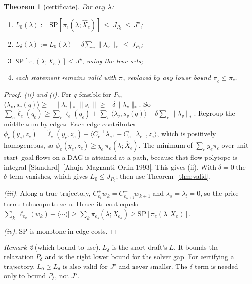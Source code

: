 \documentclass[11pt]{article}
\newcommand{\Pd}{P_\delta}
\newcommand{\Jd}{J_{P_\delta}}
\newcommand{\SP}{\mathrm{SP}}
\newcommand{\std}{\textcolor{muted}{[Standard]}\ }
\theoremstyle{plain}
\newtheorem{theorem}{Theorem}[section]
\theoremstyle{definition}
\theoremstyle{remark}
\newtheorem{remark}[theorem]{Remark}
\begin{document}
\begin{theorem}[certificate]\label{thm:cert}
For any $\lambda$:
\begin{enumerate}[label=(\roman*),leftmargin=1.6em]
  \item $L_0(\lambda):=\SP[\pi_e(\lambda;\hat X_e)]\ \le\ J_{P_0}\ \le\ J^\star$;
  \item $L_\delta(\lambda):=L_0(\lambda)-\delta\sum_v\|\lambda_v\|_*\ \le\ \Jd$;
  \item $\SP[\pi_e(\lambda;X_e)]\le J^\star$, using the true sets;
  \item each statement remains valid with $\pi_e$ replaced by any lower bound $\underline\pi_e\le\pi_e$.
\end{enumerate}
\end{theorem}
\begin{proof}
\emph{(ii) and (i).} For $q$ feasible for $\Pd$, $\langle\lambda_v,s_v(q)\rangle\ge-\|\lambda_v\|_*\|s_v\|\ge-\delta\|\lambda_v\|_*$. So
$\sum_e\tilde\ell_e(q_e)\ge\sum_e\tilde\ell_e(q_e)+\sum_v\langle\lambda_v,s_v(q)\rangle-\delta\sum_v\|\lambda_v\|_*$.
Regroup the middle sum by edges. Each edge contributes $\phi_e(y_e,z_e)=\tilde\ell_e(y_e,z_e)+\langle C_e^{+\top}\lambda_{e^+}-C_e^{-\top}\lambda_{e^-},z_e\rangle$, which is positively homogeneous, so $\phi_e(y_e,z_e)\ge y_e\,\pi_e(\lambda;\hat X_e)$. The minimum of $\sum_ey_e\pi_e$ over unit start--goal flows on a DAG is attained at a path, because that flow polytope is integral \std[Ahuja--Magnanti--Orlin 1993]. This gives (ii). With $\delta=0$ the $\delta$ term vanishes, which gives $L_0\le J_{P_0}$; then use Theorem~\ref{thm:valid}.

\emph{(iii).} Along a true trajectory, $C^+_{e_k}w_k=C^-_{e_{k+1}}w_{k+1}$ and $\lambda_s=\lambda_t=0$, so the price terms telescope to zero. Hence its cost equals $\sum_k\big[\ell_{e_k}(w_k)+\langle\cdots\rangle\big]\ge\sum_k\pi_{e_k}(\lambda;X_{e_k})\ge\SP[\pi_e(\lambda;X_e)]$.

\emph{(iv).} $\SP$ is monotone in edge costs.
\end{proof}

\begin{remark}[which bound to use]\label{rem:whichL}
$L_\delta$ is the short draft's $L$. It bounds the relaxation $\Pd$ and is the right lower bound for the solver gap. For certifying a trajectory, $L_0\ge L_\delta$ is also valid for $J^\star$ and never smaller. The $\delta$ term is needed only to bound $\Pd$, not $J^\star$.
\end{remark}
\end{document}
